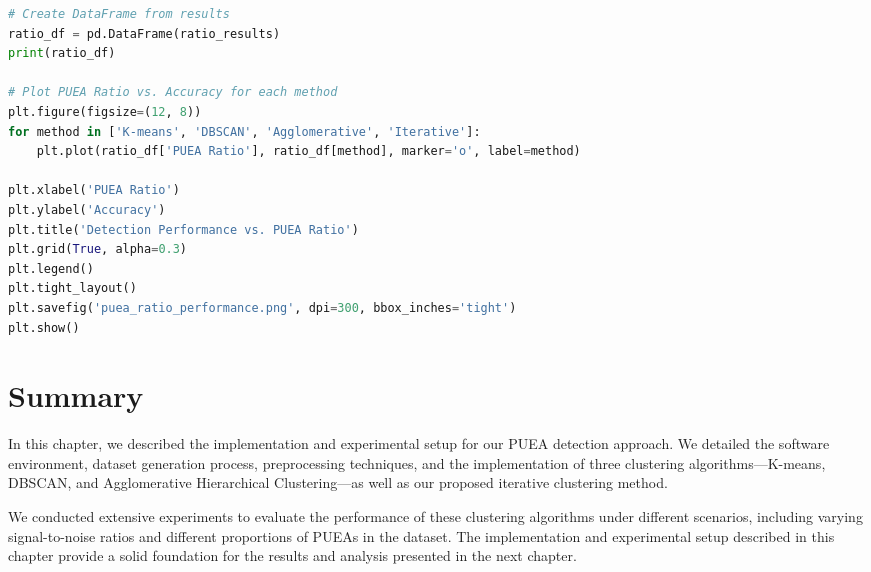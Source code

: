 \begin{lstlisting}[language=Python, caption=PUEA Percentage Experiment Implementation]
# Create DataFrame from results
ratio_df = pd.DataFrame(ratio_results)
print(ratio_df)

# Plot PUEA Ratio vs. Accuracy for each method
plt.figure(figsize=(12, 8))
for method in ['K-means', 'DBSCAN', 'Agglomerative', 'Iterative']:
    plt.plot(ratio_df['PUEA Ratio'], ratio_df[method], marker='o', label=method)

plt.xlabel('PUEA Ratio')
plt.ylabel('Accuracy')
plt.title('Detection Performance vs. PUEA Ratio')
plt.grid(True, alpha=0.3)
plt.legend()
plt.tight_layout()
plt.savefig('puea_ratio_performance.png', dpi=300, bbox_inches='tight')
plt.show()
\end{lstlisting}

\section{Summary}
In this chapter, we described the implementation and experimental setup for our PUEA detection approach. We detailed the software environment, dataset generation process, preprocessing techniques, and the implementation of three clustering algorithms—K-means, DBSCAN, and Agglomerative Hierarchical Clustering—as well as our proposed iterative clustering method.

We conducted extensive experiments to evaluate the performance of these clustering algorithms under different scenarios, including varying signal-to-noise ratios and different proportions of PUEAs in the dataset. The implementation and experimental setup described in this chapter provide a solid foundation for the results and analysis presented in the next chapter.

\begin{thebibliography}{99}
\end{thebibliography}
